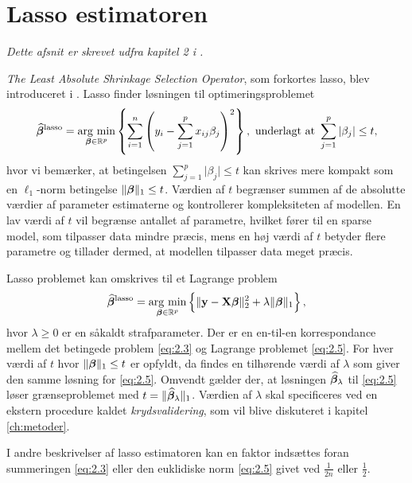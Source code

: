 \section{Lasso estimatoren} \label{sec:lasso_estimatoren}
\textit{Dette afsnit er skrevet udfra kapitel 2 i \citep{hastie}.}

\textit{The Least Absolute Shrinkage Selection Operator}, som forkortes lasso, blev introduceret i \citep{lasso}. 
Lasso finder løsningen til optimeringsproblemet
\begin{align}
\widehat{\tbeta}^\text{lasso} = \argmin_{\tbeta \in \R^p} \cbr{\sum_{i=1}^n \del{y_i - \sum_{j=1}^p x_{ij} \beta_j}^2}, \ \text{underlagt at } \sum_{j=1}^p \vert \beta_j \vert \leq t, \label{eq:2.3}
\end{align} 
hvor vi bemærker, at betingelsen $\sum_{j=1}^p \vert \beta_j \vert \leq t$ kan skrives mere kompakt som en \(\ell_1\)-norm betingelse $\Vert \boldsymbol{\beta} \Vert_1 \leq t$.
Værdien af \(t\) begrænser summen af de absolutte værdier af parameter estimaterne og kontrollerer kompleksiteten af modellen. 
En lav værdi af \(t\) vil begrænse antallet af parametre, hvilket fører til en sparse model, som tilpasser data mindre præcis, mens en høj værdi af \(t\) betyder flere parametre og tillader dermed, at modellen tilpasser data meget præcis.

Lasso problemet kan omskrives til et Lagrange problem
\begin{align}
\widehat{\tbeta}^\text{lasso} = \argmin_{\tbeta \in \R^p} \cbr{ \Vert \y - \X \tbeta \Vert_2^2 + \lambda \Vert \tbeta \Vert_1}, \label{eq:2.5}
\end{align}
hvor $\lambda \geq 0$ er en såkaldt strafparameter. 
Der er en en-til-en korrespondance mellem det betingede problem \eqref{eq:2.3} og Lagrange problemet \eqref{eq:2.5}. 
For hver værdi af \(t\) hvor \(\Vert \boldsymbol{\beta} \Vert_1 \leq t\) er opfyldt, da findes en tilhørende værdi af $\lambda$ som giver den samme løsning for \eqref{eq:2.5}.
Omvendt gælder der, at løsningen $\widehat{\boldsymbol{\beta}}_\lambda$ til \eqref{eq:2.5} løser grænseproblemet med $t=\Vert \widehat{\boldsymbol{\beta}}_\lambda \Vert_1$.
Værdien af \(\lambda\) skal specificeres ved en ekstern procedure kaldet \textit{krydsvalidering}, som vil blive diskuteret i kapitel \ref{ch:metoder}.

I andre beskrivelser af lasso estimatoren kan en faktor indsættes foran summeringen \eqref{eq:2.3} eller den euklidiske norm \eqref{eq:2.5} givet ved \(\frac{1}{2n}\) eller \(\frac{1}{2}\).

